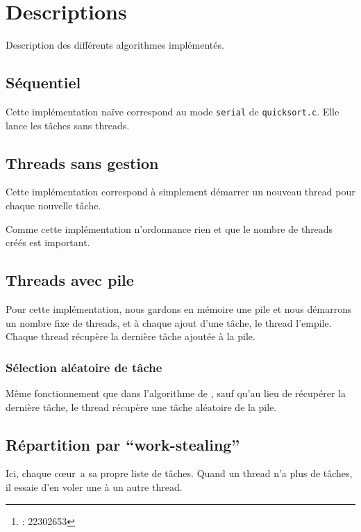 \documentclass[a4paper]{article}
\title{\docTitle}
\author{\href{\authorMail}{\anri}\thanks{\anri : 22302653}}
\date{Année universitaire 2023-2024}
\def\coeur{c\oe{}ur}
\def\ws{\enquote{work-stealing}}
\newcommand{\docref}[1]{\textit{\nameref{#1}}} %
\begin{document}
\maketitle
\flushbottom
\tableofcontents
\clearpage


\section{Descriptions}
Description des différents algorithmes implémentés.

\subsection{Séquentiel}
Cette implémentation naïve correspond au mode \texttt{serial}
de \texttt{quicksort.c}. Elle lance les tâches sans threads.

\subsection[Threads sans gestion]{Threads sans gestion}
Cette implémentation correspond à simplement démarrer un nouveau thread
pour chaque nouvelle tâche.

Comme cette implémentation n'ordonnance rien et que le nombre de threads créés
est important.

\subsection{Threads avec pile}\label{desc:th_pile}
Pour cette implémentation, nous gardons en mémoire une pile et nous démarrons
un nombre fixe de threads, et à chaque ajout d'une tâche, le thread l'empile.
Chaque thread récupère la dernière tâche ajoutée à la pile.

\subsubsection{Sélection aléatoire de tâche}
Même fonctionnement que dans l'algorithme de \docref{desc:th_pile}, sauf
qu'au lieu de récupérer la dernière tâche, le thread récupère une tâche
aléatoire de la pile.

\subsection{Répartition par \ws}\label{desc:ws}
Ici, chaque \coeur~a sa propre liste de tâches. Quand un thread n'a
plus de tâches, il essaie d'en voler une à un autre thread.
\end{document}

